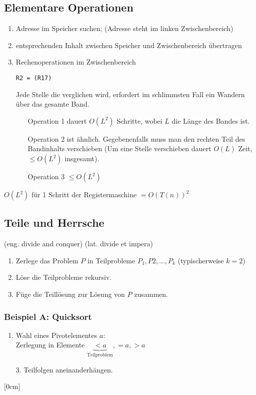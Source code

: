 \subsection{Elementare Operationen}
\begin{enumerate}
\item Adresse im Speicher suchen; (Adresse steht im linken Zwischenbereich)
\item entsprechenden Inhalt zwischen Speicher und Zwischenbereich übertragen
\item Rechenoperationen im Zwischenbereich
\begin{lstlisting}
R2 = (R17)
\end{lstlisting}
Jede Stelle die verglichen wird, erfordert im schlimmsten Fall ein Wandern über das gesamte Band.\\
\begin{enumerate}
\item[Operation 1] dauert $O(L^2)$ Schritte, wobei $L$ die Länge des Bandes ist.\\
\item[Operation 2] ist ähnlich. Gegebenenfalls muss man den rechten Teil des Bandinhalts verschieben (Um eine Stelle verschieben dauert $O(L)$ Zeit, $\leq O(L^2)$ insgesamt).
\item[Operation 3] $\leq O(L^2)$
\end{enumerate}
\end{enumerate}
$O(L^2)$ für 1 Schritt der Registermaschine $= O(T(n))^2$\\

\subsection{Teile und Herrsche}
(eng. divide and conquer) (lat. divide et impera)\\
\begin{enumerate}
\item Zerlege das Problem $P$ in Teilprobleme $P_1,P2,...,P_k$ (typischerweise $k=2$)
\item Löse die Teilprobleme rekursiv.
\item Füge die Teillösung zur Lösung von $P$ zusammen.
\end{enumerate}
\subsubsection{Beispiel A: Quicksort}
\begin{enumerate}
\item Wahl eines Pivotelementes $a$:\\
Zerlegung in Elemente $\underbrace{<a}_\text{Teilproblem}, =a, >a$
\item[3.] Teilfolgen aneinanderhängen.\\
\end{enumerate}
[0cm]
